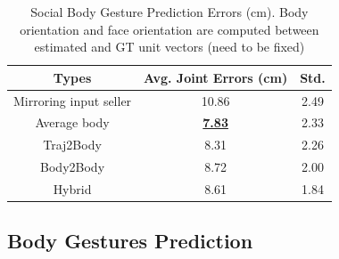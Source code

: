\begin{table}[t]
	\centering
	\footnotesize
	\label{table:predBody_errors}
	\begin{tabular}{c| c| c}
		
		\hline
		Types & Avg. Joint Errors (cm) & Std.\\
		\hline
		Mirroring input seller & 10.86 &2.49\\
		\hline
		Average body & \underline {\textbf{7.83}} & 2.33\\
		\hline
		Traj2Body & 8.31 & 2.26\\
		\hline
		Body2Body & 8.72 & 2.00\\
		\hline
		Hybrid & 8.61  & 1.84\\
		\hline
	\end{tabular}
	\caption{Social Body Gesture Prediction Errors (cm). Body orientation and face orientation are computed between estimated and GT unit vectors (need to be fixed)}
\end{table}



\subsection{Body Gestures Prediction}

